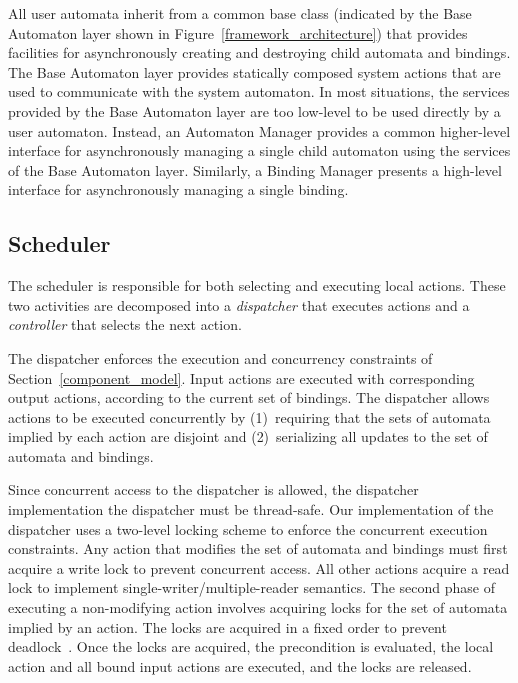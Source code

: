 All user automata inherit from a common base class (indicated by the Base Automaton layer shown in Figure~\ref{framework_architecture}) that provides facilities for asynchronously creating and destroying child automata and bindings.
The Base Automaton layer provides statically composed system actions that are used to communicate with the system automaton.
In most situations, the services provided by the Base Automaton layer are too low-level to be used directly by a user automaton.
Instead, an Automaton Manager provides a common higher-level interface for asynchronously managing a single child automaton using the services of the Base Automaton layer.
Similarly, a Binding Manager presents a high-level interface for asynchronously managing a single binding.

\subsection{Scheduler\label{scheduling}}

The scheduler is responsible for both selecting and executing local actions.
These two activities are decomposed into a \emph{dispatcher} that executes actions and a \emph{controller} that selects the next action.

The dispatcher enforces the execution and concurrency constraints of Section~\ref{component_model}.
Input actions are executed with corresponding output actions, according to the current set of bindings.
The dispatcher allows actions to be executed concurrently by (1)~requiring that the sets of automata implied by each action are disjoint and (2)~serializing all updates to the set of automata and bindings.

Since concurrent access to the dispatcher is allowed, the dispatcher implementation the dispatcher must be thread-safe.
Our implementation of the dispatcher uses a two-level locking scheme to enforce the concurrent execution constraints.
Any action that modifies the set of automata and bindings must first acquire a write lock to prevent concurrent access.
All other actions acquire a read lock to implement single-writer/multiple-reader semantics.
The second phase of executing a non-modifying action involves acquiring locks for the set of automata implied by an action.
The locks are acquired in a fixed order to prevent deadlock~\cite{havender1968avoiding}.
Once the locks are acquired, the precondition is evaluated, the local action and all bound input actions are executed, and the locks are released.

